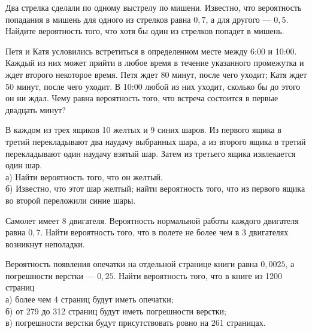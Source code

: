 \newpage\setcounter{zad}{0}



\begin{zkrW}{20}\noindent 
	Два стрелка сделали по одному выстрелу по мишени. Известно, что вероятность попадания в мишень для одного из стрелков равна $0{,}7$, а для другого --- $0{,}5$. Найдите вероятность того, что хотя бы один из стрелков попадет в мишень.
 
\end{zkrW}

\begin{zkrW}{20}\noindent 
	Петя и Катя условились встретиться в определенном месте между 6:00 и 10:00. Каждый из них может прийти в любое время в течение указанного промежутка и ждет второго некоторое время. Петя ждет 80 минут, после чего уходит; Катя ждет 50 минут, после чего уходит. В 10:00 любой из них уходит, сколько бы до этого он ни ждал. Чему равна вероятность того, что встреча состоится в первые двадцать минут?
 
\end{zkrW}

\begin{zkrW}{20}\noindent 
	В каждом из трех ящиков 10 желтых и 9 синих шаров. Из первого ящика в третий перекладывают два наудачу выбранных шара, а из второго ящика в третий перекладывают один наудачу взятый шар. Затем из третьего ящика извлекается один шар. \\ \indent а) Найти вероятность того, что он желтый. \\ \indent б) Известно, что этот шар желтый; найти вероятность того, что из первого ящика во второй переложили синие шары.
 
\end{zkrW}

\begin{zkrW}{20}\noindent 
	Самолет имеет 8 двигателя. Вероятность нормальной работы каждого двигателя равна $0{,}7$. Найти вероятность того, что в полете не более чем в 3 двигателях возникнут неполадки.
 
\end{zkrW}

\begin{zkrW}{20}\noindent 
	Вероятность появления опечатки на отдельной странице книги равна $0{,}0025$, а погрешности верстки --- $0{,}25$. Найти вероятность того, что в книге из 1200 страниц \\ \indent а) более чем 4 страниц будут иметь опечатки; \\ \indent б) от 279 до 312 страниц будут иметь погрешности верстки; \\ \indent в) погрешности верстки будут присутствовать ровно на 261 страницах.
 
\end{zkrW}

